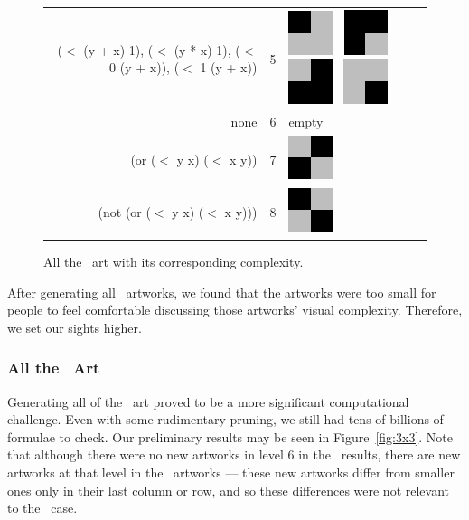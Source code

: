 \begin{figure}
\begin{center}
\begin{tabular}{r c l}
\tiny{($<$ (y + x) 1), ($<$ (y * x) 1), ($<$ 0 (y + x)), ($<$ 1 (y + x))} & 5 & 
    \includegraphics[width=.25in]{../presentation/2x2/Shape2LVL5.png}~
    \includegraphics[width=.25in]{../presentation/2x2/Shape1LVL5.png}~
    \includegraphics[width=.25in]{../presentation/2x2/Shape3LVL5.png}~
    \includegraphics[width=.25in]{../presentation/2x2/Shape4LVL5.png} \\
\tiny{none} & 6 & empty \\
\tiny{(or ($<$ y  x) ($<$ x  y))} & 7 &
    \includegraphics[width=.25in]{../presentation/2x2/Shape1LVL7.png}\\
\tiny{(not (or ($<$ y  x) ($<$ x  y)))} & 8 &
    \includegraphics[width=.25in]{../presentation/2x2/Shape1LVL8.png}
\end{tabular}
\end{center}

\caption{All the \twoxtwo\ art with its corresponding complexity.}
\label{fig:2x2}
\end{figure}

After generating all \twoxtwo\ artworks, we found that the artworks were too
small for people to feel comfortable discussing those artworks' visual
complexity.  Therefore, we set our sights higher.

\subsubsection{All the \threexthree\ Art}

Generating all of the \threexthree\ art proved to be a more significant
computational challenge.  Even with some rudimentary pruning, we still had tens
of billions of formulae to check.  Our preliminary results may be seen in
Figure~\ref{fig:3x3}.  Note that although there were no new artworks in level 6
in the \twoxtwo\ results, there are new artworks at that level in the
\threexthree\ artworks --- these new artworks differ from smaller ones only in
their last column or row, and so these differences were not relevant to the
\twoxtwo\ case.

